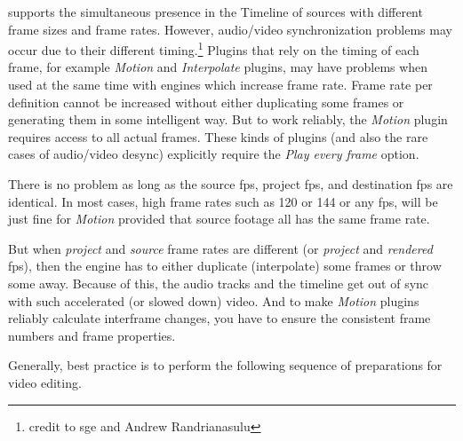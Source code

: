 \CGG{} supports the simultaneous presence in the Timeline of sources with different frame sizes and frame rates. However, audio/video synchronization problems may occur due to their different timing.\protect\footnote{credit to sge and Andrew Randrianasulu}
Plugins that rely on the timing of each frame, for example \textit{Motion} and \textit{Interpolate} plugins, may have problems when used at the same time with engines which increase frame rate. Frame rate per definition cannot be increased without either duplicating some frames or generating them in some intelligent way. But to work reliably, the \textit{Motion} plugin requires access to all actual frames. These kinds of plugins (and also the rare cases of audio/video desync) explicitly require the \textit{Play every frame} option.

There is no problem as long as the source fps, project fps, and destination fps are identical. In most cases, high frame rates such as 120 or 144 or any fps, will be just fine for \textit{Motion} provided that source footage all has the same frame rate.

But when \textit{project} and \textit{source} frame rates are different (or \textit{project} and
\textit{rendered} fps), then the \CGG{} engine has to either duplicate (interpolate) some frames or throw some away. Because of this, the audio tracks and the timeline get out of sync with such accelerated (or slowed down) video. And to make \textit{Motion} plugins reliably calculate interframe changes, you have to ensure the consistent frame numbers and frame properties.

Generally, best practice is to perform the following sequence of preparations for video editing.


